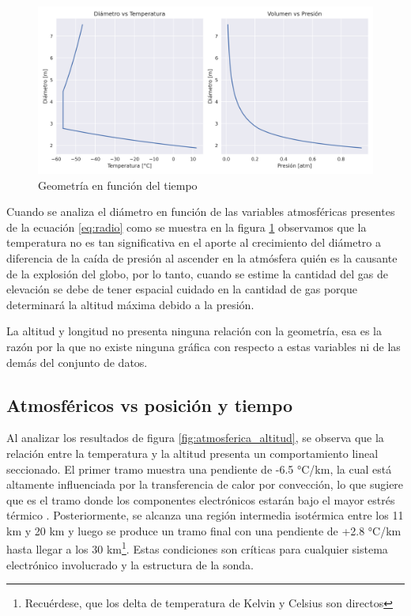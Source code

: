 \begin{figure}[h]
    \centering
    \includegraphics[width=1\linewidth]{document/figures/03_geometria_vs_atmosfera.png}
    \caption{Geometría en función del tiempo}
    \label{fig:geometria_vs_atmosferica}
\end{figure}

Cuando se analiza el diámetro en función de las variables atmosféricas presentes de la ecuación \ref{eq:radio}  como se muestra en la figura \ref{fig:geometria_vs_atmosferica} observamos que la temperatura no es tan significativa en el aporte al crecimiento del diámetro a diferencia de la caída de presión al ascender en la atmósfera quién es la causante de la explosión del globo, por lo tanto,  cuando se estime la cantidad del gas de elevación se debe de tener espacial cuidado en la cantidad  de gas porque determinará la altitud máxima debido a la presión.

La altitud y longitud no presenta ninguna relación con la geometría, esa es la razón por la que no existe ninguna gráfica con respecto a estas variables ni de las demás del conjunto de datos.

\newpage

\subsection{Atmosféricos vs posición y tiempo}

Al analizar los resultados de figura \ref{fig:atmosferica_altitud}, se observa que la relación entre la temperatura y la altitud presenta un comportamiento lineal seccionado. El primer tramo muestra una pendiente de  -6.5 °C/km, la cual está altamente influenciada por la transferencia de calor por convección, lo que sugiere que es el tramo donde los componentes electrónicos estarán bajo el mayor estrés térmico \cite{TASEC_Lab}. Posteriormente, se alcanza una región intermedia isotérmica entre los  11 km y 20 km y luego se produce un tramo final con una pendiente de +2.8 °C/km hasta llegar a los 30 km\footnote{Recuérdese, que los delta de temperatura de Kelvin y Celsius son directos}. Estas condiciones son críticas para cualquier sistema electrónico involucrado y la estructura de la sonda.

